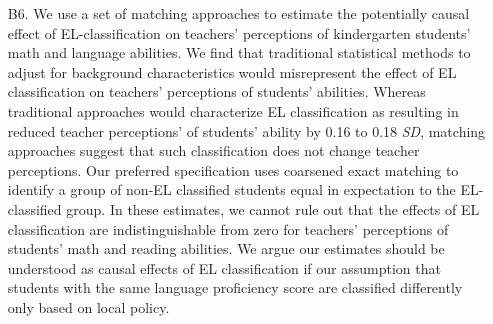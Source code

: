 \documentclass[a4paper, 11pt]{article}
\begin{document}
\begin{landscape}

\end{landscape}

\begin{enumerate}

	\item[B6.] We use a set of matching approaches to estimate the potentially causal effect of EL-classification on teachers' perceptions of kindergarten students' math and language abilities. We find that traditional statistical methods to adjust for background characteristics would misrepresent the effect of EL classification on teachers' perceptions of students' abilities. Whereas traditional approaches would characterize EL classification as resulting in reduced teacher perceptions' of students' ability by 0.16 to 0.18 \textit{SD}, matching approaches suggest that such classification does not change teacher perceptions. Our preferred specification uses coarsened exact matching to identify a group of non-EL classified students equal in expectation to the EL-classified group. In these estimates, we cannot rule out that the effects of EL classification are indistinguishable from zero for teachers' perceptions of students' math and reading abilities. We argue our estimates should be understood as causal effects of EL classification if our assumption that students with the same language proficiency score are classified differently only based on local policy. 

\end{enumerate}		
\end{document}
